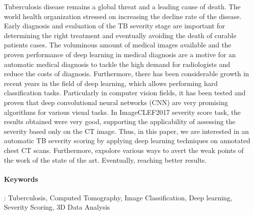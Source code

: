Tuberculosis disease remains a global threat and a leading cause of death. The world health organization stressed on increasing the decline rate of the disease. Early diagnosis and evaluation of the TB severity stage are important for determining the right treatment and eventually avoiding the death of curable patients cases. The voluminous amount of medical images available and the proven performance of deep learning in medical diagnosis are a motive for an automatic medical diagnosis to tackle the high demand for radiologists and reduce the costs of diagnosis. Furthermore, there has been considerable growth in recent years in the field of deep learning, which allows performing hard classification tasks. Particularly in computer vision fields, it has been tested and proven that deep convolutional neural networks (CNN) are very promising algorithms for various visual tasks. In ImageCLEF2017 severity score task, the results obtained were very good, supporting the applicability of assessing the severity based only on the CT image. Thus, in this paper, we are interested in an automatic TB severity scoring by applying deep learning techniques on annotated chest CT scans. Furthermore, expolore various ways to avert the weak points of the work of the state of the art. Eventually, reaching better results.
\paragraph{Keywords}: Tuberculosis, Computed Tomography, Image Classification, Deep learning, Severity Scoring, 3D Data Analysis